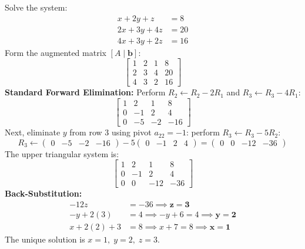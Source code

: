\begin{examplebox}
Solve the system:
\begin{equation}
    \begin{aligned}
        x + 2y + z &= 8 \\
        2x + 3y + 4z &= 20 \\
        4x + 3y + 2z &= 16
    \end{aligned}
\end{equation}
Form the augmented matrix $[A \mid \mathbf{b}]$:
\begin{equation}
    \left[\begin{array}{ccc|c}
    1 & 2 & 1 & 8 \\
    2 & 3 & 4 & 20 \\
    4 & 3 & 2 & 16
    \end{array}\right]
\end{equation}
\textbf{Standard Forward Elimination:}
Perform $R_2 \leftarrow R_2 - 2R_1$ and $R_3 \leftarrow R_3 - 4R_1$:
\begin{equation}
    \left[\begin{array}{ccc|c}
    1 & 2 & 1 & 8 \\
    0 & -1 & 2 & 4 \\
    0 & -5 & -2 & -16
    \end{array}\right]
\end{equation}
Next, eliminate $y$ from row 3 using pivot $a_{22} = -1$: perform $R_3 \leftarrow R_3 - 5R_2$:
\begin{equation}
    R_3 \leftarrow \begin{pmatrix} 0 & -5 & -2 & -16 \end{pmatrix} - 5\begin{pmatrix} 0 & -1 & 2 & 4 \end{pmatrix} = \begin{pmatrix} 0 & 0 & -12 & -36 \end{pmatrix}
\end{equation}
The upper triangular system is:
\begin{equation}
    \left[\begin{array}{ccc|c}
    1 & 2 & 1 & 8 \\
    0 & -1 & 2 & 4 \\
    0 & 0 & -12 & -36
    \end{array}\right]
\end{equation}
\textbf{Back-Substitution:}
\begin{align}
    -12z &= -36 \implies \mathbf{z = 3} \\
    -y + 2(3) &= 4 \implies -y + 6 = 4 \implies \mathbf{y = 2} \\
    x + 2(2) + 3 &= 8 \implies x + 7 = 8 \implies \mathbf{x = 1}
\end{align}
The unique solution is $\boxed{x = 1, \; y = 2, \; z = 3}$.
\end{examplebox}

